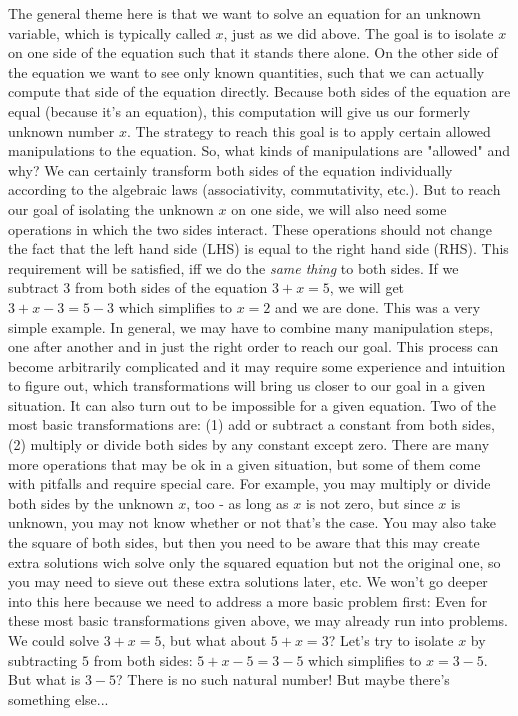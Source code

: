 \medskip
The general theme here is that we want to solve an equation for an unknown variable, which is typically called $x$, just as we did above. The goal is to isolate $x$ on one side of the equation such that it stands there alone. On the other side of the equation we want to see only known quantities, such that we can actually compute that side of the equation directly. Because both sides of the equation are equal (because it's an equation), this computation will give us our formerly unknown number $x$. The strategy to reach this goal is to apply certain allowed manipulations to the equation. So, what kinds of manipulations are "allowed" and why?  We can certainly transform both sides of the equation individually according to the algebraic laws (associativity, commutativity, etc.). But to reach our goal of isolating the unknown $x$ on one side, we will also need some operations in which the two sides interact. These operations should not change the fact that the left hand side (LHS) is equal to the right hand side (RHS). This requirement will be satisfied, iff we do the \emph{same thing} to both sides. If we subtract $3$ from both sides of the equation $3 + x = 5$, we will get $3 + x - 3 = 5 - 3$ which simplifies to $x = 2$ and we are done. This was a very simple example. In general, we may have to combine many manipulation steps, one after another and in just the right order to reach our goal. This process can become arbitrarily complicated  and it may require some experience and intuition to figure out, which transformations will bring us closer to our goal in a given situation. It can also turn out to be impossible for a given equation. Two of the most basic transformations are: (1) add or subtract a constant from both sides, (2) multiply or divide both sides by any constant except zero. There are many more operations that may be ok in a given situation, but some of them come with pitfalls and require special care. For example, you may multiply or divide both sides by the unknown $x$, too - as long as $x$ is not zero, but since $x$ is unknown, you may not know whether or not that's the case. You may also take the square of both sides, but then you need to be aware that this may create extra solutions wich solve only the squared equation but not the original one, so you may need to sieve out these extra solutions later, etc. We won't go deeper into this here because we need to address a more basic problem first: Even for these most basic transformations given above, we may already run into problems. We could solve $3 + x = 5$, but what about $5 + x = 3$? Let's try to isolate $x$ by subtracting $5$ from both sides: $5 + x - 5 = 3 - 5$ which simplifies to $x = 3 - 5$. But what is $3-5$? There is no such natural number! But maybe there's something else...

